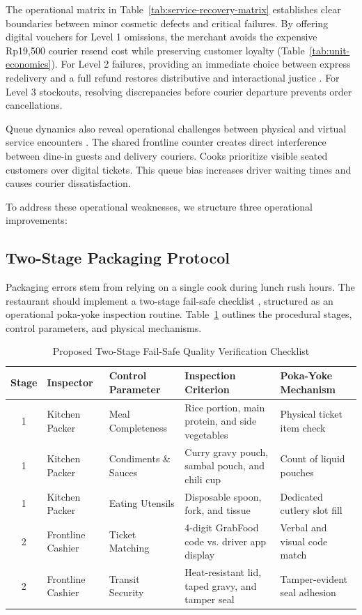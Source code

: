 \documentclass{jomas}
\begin{document}
The operational matrix in Table~\ref{tab:service-recovery-matrix} establishes clear boundaries between minor cosmetic defects and critical failures. By offering digital vouchers for Level 1 omissions, the merchant avoids the expensive Rp19,500 courier resend cost while preserving customer loyalty (Table~\ref{tab:unit-economics}). For Level 2 failures, providing an immediate choice between express redelivery and a full refund restores distributive and interactional justice \parencite{smith1999servicerecovery}. For Level 3 stockouts, resolving discrepancies before courier departure prevents order cancellations.

Queue dynamics also reveal operational challenges between physical and virtual service encounters \parencite{bitner1992servicescapes}. The shared frontline counter creates direct interference between dine-in guests and delivery couriers. Cooks prioritize visible seated customers over digital tickets. This queue bias increases driver waiting times and causes courier dissatisfaction.

To address these operational weaknesses, we structure three operational improvements:

\subsection{Two-Stage Packaging Protocol}
Packaging errors stem from relying on a single cook during lunch rush hours. The restaurant should implement a two-stage fail-safe checklist \parencite{chase1994failsafe}, structured as an operational poka-yoke inspection routine. Table~\ref{tab:poka-yoke-checklist} outlines the procedural stages, control parameters, and physical mechanisms.

\begin{table}[H]
\caption{Proposed Two-Stage Fail-Safe Quality Verification Checklist}
\label{tab:poka-yoke-checklist}
\centering
\small
\renewcommand{\arraystretch}{0.95}
\setlength{\tabcolsep}{4.5pt}
\begin{tabularx}{\textwidth}{c l l X l}
\toprule
\textbf{Stage} & \textbf{Inspector} & \textbf{Control Parameter} & \textbf{Inspection Criterion} & \textbf{Poka-Yoke Mechanism} \\
\midrule
1 & Kitchen Packer & Meal Completeness & Rice portion, main protein, and side vegetables & Physical ticket item check \\
1 & Kitchen Packer & Condiments \& Sauces & Curry gravy pouch, sambal pouch, and chili cup & Count of liquid pouches \\
1 & Kitchen Packer & Eating Utensils & Disposable spoon, fork, and tissue & Dedicated cutlery slot fill \\
2 & Frontline Cashier & Ticket Matching & 4-digit GrabFood code vs. driver app display & Verbal and visual code match \\
2 & Frontline Cashier & Transit Security & Heat-resistant lid, taped gravy, and tamper seal & Tamper-evident seal adhesion \\
\bottomrule
\end{tabularx}
\end{table}
\end{document}
